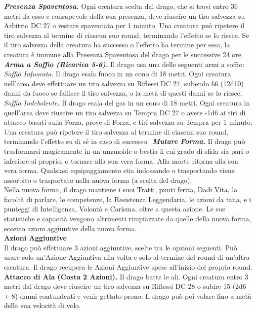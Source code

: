 \begin{multicols}{2}
\emph{\textbf{Presenza Spaventosa.}} Ogni creatura scelta dal drago, che si trovi entro 36 metri da esso e consapevole della sua presenza, deve riuscire un tiro salvezza su Arbitrio DC  27 o restare spaventata per 1 minuto. Una creatura può ripetere il tiro salvezza al termine di ciascun suo round, terminando l'effetto se lo riesce. Se il tiro salvezza della creatura ha successo o l'effetto ha termine per essa, la creatura è immune alla Presenza Spaventosa del drago per le successive 24 ore.\\
\emph{\textbf{Arma a Soffio (Ricarica 5-6).}} Il drago usa una delle seguenti armi a soffio:\\
\emph{Soffio Infuocato.} Il drago esala fuoco in un cono di 18 metri. Ogni creatura nell'area deve effettuare un tiro salvezza su Riflessi DC  27, subendo 66 (12d10) danni da fuoco se fallisce il tiro salvezza, o la metà di questi danni se lo riesce.\\
\emph{Soffio Indebolente.} Il drago esala del gas in un cono di 18 metri. Ogni creatura in quell'area deve riuscire un tiro salvezza su Tempra DC  27 o avere -1d6 ai tiri di attacco basati sulla Forza, prove di Forza, e tiri salvezza su Tempra per 1 minuto. Una creatura può ripetere il tiro salvezza al termine di ciascun suo round, terminando l'effetto su di sé in caso di successo.\
\emph{\textbf{Mutare Forma.}} Il drago può trasformarsi magicamente in un umanoide o bestia il cui grado di sfida sia pari o inferiore al proprio, o tornare alla sua vera forma. Alla morte ritorna alla sua vera forma. Qualsiasi equipaggiamento stia indossando o trasportando viene assorbito o trasportato nella nuova forma (a scelta del drago).\\
Nella nuova forma, il drago mantiene i suoi Tratti, punti ferita, Dadi Vita, la facoltà di parlare, le competenze, la Resistenza Leggendaria, le azioni da tana, e i punteggi di Intelligenza, Volontà e Carisma, oltre a questa azione. Le sue statistiche e capacità  vengono altrimenti rimpiazzate da quelle della nuova forma, eccetto azioni aggiuntive della nuova forma.\\
\textbf{Azioni Aggiuntive}\\
Il drago può effettuare 3 azioni aggiuntive, scelte tra le opzioni seguenti. Può usare solo un'Azione Aggiuntiva alla volta e solo al termine del round di un'altra creatura. Il drago recupera le Azioni Aggiuntive spese all'inizio del proprio round.\\
\textbf{Attacco di Ala (Costa 2 Azioni).} Il drago batte le ali. Ogni creatura entro 3 metri dal drago deve riuscire un tiro salvezza su Riflessi DC  28 o subire 15 (2d6 + 8) danni contundenti e venir gettato prono. Il drago può poi volare fino a metà della sua velocità di volo.\\

\end{multicols}
